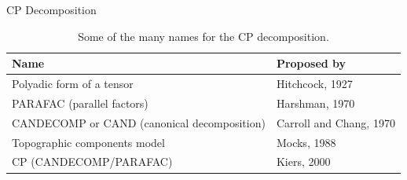 \documentclass[t, 10pt, handout, aspectratio=169]{beamer}
\begin{document}


\begin{frame}{CP Decomposition}
\large
\begin{table}
\begin{tabular}{l | l}
\textbf{Name} & \textbf{Proposed by} \\
\hline \hline
Polyadic form of a tensor & Hitchcock, 1927 \\ 
PARAFAC (parallel factors) & Harshman, 1970\\
CANDECOMP or CAND (canonical decomposition) & Carroll and Chang, 1970\\
Topographic components model & Mocks, 1988 \\
CP (CANDECOMP/PARAFAC) & Kiers, 2000
\end{tabular}
\caption{Some of the many names for the CP decomposition.}
\end{table}
\end{frame}
\end{document}
